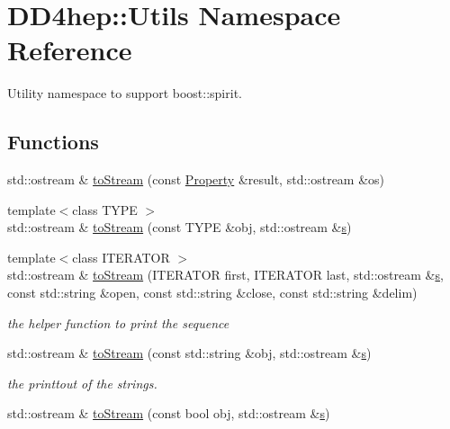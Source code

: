 \hypertarget{namespace_d_d4hep_1_1_utils}{}\section{D\+D4hep\+:\+:Utils Namespace Reference}
\label{namespace_d_d4hep_1_1_utils}


Utility namespace to support boost\+::spirit.  


\subsection*{Functions}
\begin{DoxyCompactItemize}
\item 
std\+::ostream \& \hyperlink{namespace_d_d4hep_1_1_utils_ab016d8d624f13c9f5470910f2057b860}{to\+Stream} (const \hyperlink{class_d_d4hep_1_1_property}{Property} \&result, std\+::ostream \&os)
\item 
{\footnotesize template$<$class T\+Y\+PE $>$ }\\std\+::ostream \& \hyperlink{namespace_d_d4hep_1_1_utils_a427d8efde90cd13f3934319c89ef6c35}{to\+Stream} (const T\+Y\+PE \&obj, std\+::ostream \&\hyperlink{_volumes_8cpp_a17ca6bfc8040d695d3cada22a4763d40}{s})
\item 
{\footnotesize template$<$class I\+T\+E\+R\+A\+T\+OR $>$ }\\std\+::ostream \& \hyperlink{namespace_d_d4hep_1_1_utils_acf5ffb31569b70cc4e4b347b5f8d858f}{to\+Stream} (I\+T\+E\+R\+A\+T\+OR first, I\+T\+E\+R\+A\+T\+OR last, std\+::ostream \&\hyperlink{_volumes_8cpp_a17ca6bfc8040d695d3cada22a4763d40}{s}, const std\+::string \&open, const std\+::string \&close, const std\+::string \&delim)
\begin{DoxyCompactList}\small\item\em the helper function to print the sequence \end{DoxyCompactList}\item 
std\+::ostream \& \hyperlink{namespace_d_d4hep_1_1_utils_aa018a120e53fa6edbb44f423a31baa21}{to\+Stream} (const std\+::string \&obj, std\+::ostream \&\hyperlink{_volumes_8cpp_a17ca6bfc8040d695d3cada22a4763d40}{s})
\begin{DoxyCompactList}\small\item\em the printtout of the strings. \end{DoxyCompactList}\item 
std\+::ostream \& \hyperlink{namespace_d_d4hep_1_1_utils_a4f1e298302e413af8ba3059d36f85336}{to\+Stream} (const bool obj, std\+::ostream \&\hyperlink{_volumes_8cpp_a17ca6bfc8040d695d3cada22a4763d40}{s})

\end{DoxyCompactItemize}

